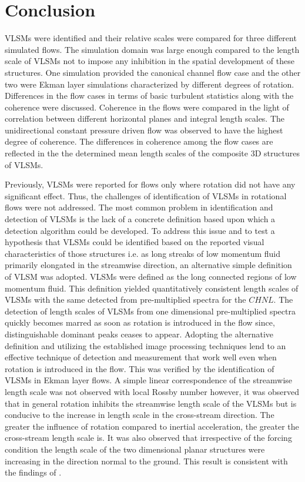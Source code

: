 \documentclass{amsart}
\begin{document}
\section{Conclusion}
VLSMs were identified and their relative scales were compared for three different simulated flows. The simulation domain was large enough compared to the length scale of VLSMs not to impose any inhibition in the spatial development of these structures. One simulation provided the canonical channel flow case and the other two were Ekman layer simulations characterized by different degrees of rotation. Differences in the flow cases in terms of basic turbulent statistics along with the coherence were discussed. Coherence in the flows were compared in the light of correlation between different horizontal planes and integral length scales. The unidirectional constant pressure driven flow was observed to have the highest degree of coherence. The differences in coherence among the flow cases are reflected in the the determined mean length scales of the composite 3D structures of VLSMs.

Previously, VLSMs were reported for flows only where rotation did not have any significant effect. Thus, the challenges of identification of VLSMs in rotational flows were not addressed. The most common problem in identification and detection of VLSMs is the lack of a concrete definition based upon which a detection algorithm could be developed. To address this issue and to test a hypothesis that VLSMs could be identified based on the reported visual characteristics of those structures i.e. as long streaks of low momentum fluid primarily elongated in the streamwise direction, an alternative simple definition of VLSM was adopted. VLSMs were defined as the long connected regions of low momentum fluid. This definition yielded quantitatively consistent length scales of VLSMs with the same detected from pre-multiplied spectra for the $CHNL$. The detection of length scales of VLSMs from one dimensional pre-multiplied spectra quickly becomes marred as soon as rotation is introduced in the flow since, distinguishable dominant peaks ceases to appear. Adopting the alternative definition and utilizing the established image processing techniques lend to an effective technique of detection and measurement that work well even when rotation is introduced in the flow. This was verified by the identification of VLSMs in Ekman layer flows. A simple linear correspondence of the streamwise length scale was not observed with local Rossby number however, it was observed that in general rotation inhibits the streamwise length scale of the VLSMs but is conducive to the increase in length scale in the cross-stream direction. The greater the influence of rotation compared to inertial acceleration, the greater the cross-stream length scale is. It was also observed that irrespective of the forcing condition the length scale of the two dimensional planar structures were increasing in the direction normal to the ground. This result is consistent with the findings of \citet{de_silva_hutchins_jfm_2016}. 



\end{document}
